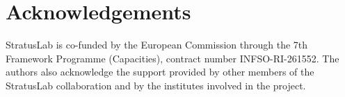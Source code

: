 \section*{Acknowledgements}

StratusLab is co-funded by the European Commission through the 7th
Framework Programme (Capacities), contract number INFSO-RI-261552.
The authors also acknowledge the support provided by other members of
the StratusLab collaboration and by the institutes involved in the
project.
